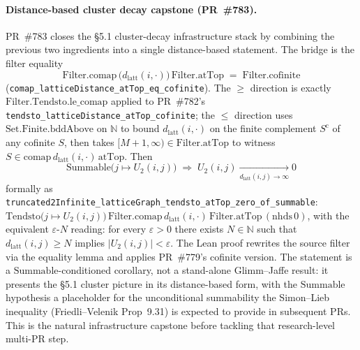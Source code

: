 \documentclass[a4paper,11pt]{article}
\begin{document}
\paragraph{Distance-based cluster decay capstone (PR~\#783).}
PR~\#783 closes the §5.1 cluster-decay infrastructure stack by
combining the previous two ingredients into a single distance-based
statement. The bridge is the filter equality
\[
  \mathrm{Filter.comap}\,\bigl(d_{\mathrm{latt}}(i, \cdot)\bigr)\,
    \mathrm{Filter.atTop} \;=\; \mathrm{Filter.cofinite}
\]
(\texttt{comap\_latticeDistance\_atTop\_eq\_cofinite}). The $\ge$
direction is exactly $\mathrm{Filter.Tendsto.le\_comap}$ applied to
PR~\#782's \texttt{tendsto\_latticeDistance\_atTop\_cofinite}; the
$\le$ direction uses $\mathrm{Set.Finite.bddAbove}$ on $\mathbb N$
to bound $d_{\mathrm{latt}}(i, \cdot)$ on the finite complement
$S^{\mathrm c}$ of any cofinite $S$, then takes
$[M+1, \infty) \in \mathrm{Filter.atTop}$ to witness $S \in
\mathrm{comap}\,d_{\mathrm{latt}}(i, \cdot)\,\mathrm{atTop}$. Then
\[
  \mathrm{Summable}\bigl(j \mapsto U_2(i, j)\bigr)
  \;\Longrightarrow\;
  U_2(i, j) \xrightarrow[d_{\mathrm{latt}}(i, j) \to \infty]{} 0
\]
formally as
\texttt{truncated2Infinite\_latticeGraph\_tendsto\_atTop\_zero\_of\_summable}:
$\mathrm{Tendsto}\bigl(j \mapsto U_2(i, j)\bigr)\,
\mathrm{Filter.comap}\,d_{\mathrm{latt}}(i, \cdot)\,
\mathrm{Filter.atTop}\,(\mathrm{nhds}\,0)$, with the equivalent
$\varepsilon$-$N$ reading: for every $\varepsilon > 0$ there exists
$N \in \mathbb N$ such that $d_{\mathrm{latt}}(i, j) \ge N$
implies $|U_2(i, j)| < \varepsilon$. The Lean proof rewrites the
source filter via the equality lemma and applies PR~\#779's
cofinite version. The statement is a $\mathrm{Summable}$-conditioned
corollary, not a stand-alone Glimm--Jaffe result: it presents the
\S5.1 cluster picture in its distance-based form, with the
$\mathrm{Summable}$ hypothesis a placeholder for the unconditional
summability the Simon--Lieb inequality (Friedli--Velenik
Prop~9.31) is expected to provide in subsequent PRs. This is the
natural infrastructure capstone before tackling that
research-level multi-PR step.
\end{document}
